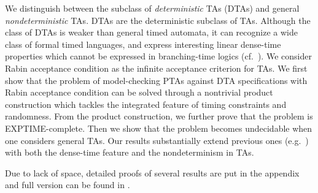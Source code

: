 \smallskip
{} We distinguish between the subclass of \emph{deterministic} TAs (DTAs) and general \emph{nondeterministic} TAs.
DTAs are the deterministic subclass of TAs.
Although the class of DTAs is weaker than general timed automata, it can recognize a wide class of formal timed languages, and express interesting linear dense-time properties which cannot be expressed in branching-time logics (cf.~\cite{DBLP:journals/tse/DonatelliHS09}).
We consider Rabin acceptance condition as the infinite acceptance criterion for TAs.
We first show that the problem of model-checking PTAs against DTA specifications with Rabin acceptance condition
can be solved through a nontrivial product construction which tackles the integrated feature of timing constraints and randomness. From the product construction, we further prove that the problem is EXPTIME-complete.
Then we show that the problem becomes undecidable when one considers general TAs.
Our results substantially extend previous ones (e.g.~\cite{DBLP:conf/qest/Sproston11}) with both the dense-time feature and the nondeterminism in TAs.

Due to lack of space, detailed proofs of several results are put in the appendix and full version can be found in \cite{DBLP:journals/corr/abs-1712-00275}.  



